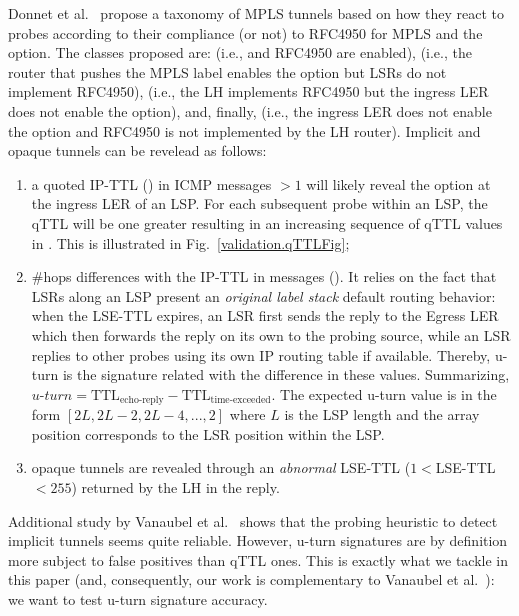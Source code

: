 Donnet et al.~\cite{Donnet12} propose a taxonomy of MPLS tunnels based on how
they react to \traceroute probes according to their compliance (or not) to
RFC4950 for MPLS and the \tpropagate option.  The classes proposed are:
 (i.e., \tpropagate and RFC4950 are enabled),
 (i.e., the router that pushes the MPLS label enables the
\tpropagate option but LSRs do not implement RFC4950), 
(i.e., the LH implements RFC4950 but the ingress LER does not enable the
\tpropagate option), and, finally,  (i.e., the ingress
LER does not enable the \tpropagate option and RFC4950 is not implemented by the
LH router).  Implicit and opaque tunnels can be revelead as follows:
\begin{enumerate}
  \item a quoted IP-TTL () in ICMP \ttlexceeded messages $>1$ will
  likely reveal the \tpropagate option at the ingress LER of an LSP. For each
  subsequent \traceroute probe within an LSP, the qTTL will be one greater
  resulting in an increasing sequence of qTTL values in \traceroute.  This is
  illustrated in Fig.~\ref{validation.qTTLFig};
  \item  \#hops differences with the IP-TTL in \echoreply messages
  ().  It relies on the fact that LSRs along an LSP present an
  \textit{original label stack} default routing behavior: when the LSE-TTL
  expires, an LSR first sends the \ttlexceeded reply to the Egress LER which
  then forwards the reply on its own to the probing source, while an LSR
  replies to other probes using its own IP routing table if available. Thereby,
  u-turn is the signature related with the difference in these values. Summarizing, 
  $\textit{u-turn}=\text{TTL}_{\text{echo-reply}}-\text{TTL}_{\text{time-exceeded}}$.
  The expected u-turn value is in the form $[2L, 2L-2, 2L-4,..., 2]$ where $L$
  is the LSP length and the array position corresponds to the LSR position
  within the LSP.
  \item opaque tunnels are revealed through an \textit{abnormal} LSE-TTL
  ($1<$LSE-TTL$<255$) returned by the LH in the \ttlexceeded reply.
\end{enumerate}

Additional study by Vanaubel et al.~\cite{VAN2013} shows that the probing
heuristic to detect implicit tunnels seems quite reliable.  However, u-turn
signatures are by definition more subject to false positives than qTTL ones. 
This is exactly what we tackle in this paper (and, consequently, our work is
complementary to Vanaubel et al.~\cite{VAN2013}): we want to test u-turn
signature accuracy.

